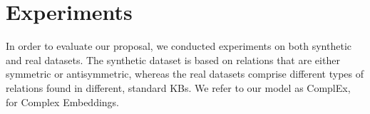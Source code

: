 \documentclass{article}
\newcommand{\Ne}{N_e} %
\newcommand{\Nr}{N_r} %
\newcommand{\rank}{K} %
\newcommand{\sample}{x_{s,r,o}}  %
\newcommand{\eemb}{e} %
\newcommand{\remb}{\mathbf{r}} %
\newcommand{\Remb}{\mathbf{R}} %
\begin{document}


\section{Experiments}
\label{sec:expe}

In order to evaluate our proposal, we conducted experiments on both synthetic and real datasets. The synthetic dataset is based on relations that are either symmetric or antisymmetric, whereas the real datasets comprise different types of relations found in different, standard KBs. We refer to our model as ComplEx, for Complex Embeddings.
\end{document}

